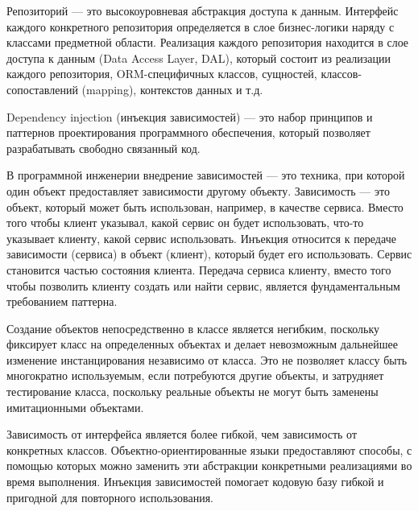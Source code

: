 Репозиторий --- это высокоуровневая абстракция доступа к данным. Интерфейс каждого конкретного репозитория определяется в слое бизнес-логики наряду с классами предметной области. Реализация каждого репозитория находится в слое доступа к данным (Data Access Layer, DAL), который состоит из реализации каждого репозитория, ORM-специфичных классов, сущностей, классов-сопоставлений (mapping), контекстов данных и т.д.



Dependency injection (инъекция зависимостей) \cite{dependency_injection} --- это набор принципов и паттернов проектирования программного обеспечения, который позволяет разрабатывать свободно связанный код.

В программной инженерии внедрение зависимостей --- это техника, при которой один объект предоставляет зависимости другому объекту. Зависимость --- это объект, который может быть использован, например, в качестве сервиса. Вместо того чтобы клиент указывал, какой сервис он будет использовать, что-то указывает клиенту, какой сервис использовать. Инъекция относится к передаче зависимости (сервиса) в объект (клиент), который будет его использовать. Сервис становится частью состояния клиента. Передача сервиса клиенту, вместо того чтобы позволить клиенту создать или найти сервис, является фундаментальным требованием паттерна.

Создание объектов непосредственно в классе является негибким, поскольку фиксирует класс на определенных объектах и делает невозможным дальнейшее изменение инстанцирования независимо от класса. Это не позволяет классу быть многократно используемым, если потребуются другие объекты, и затрудняет тестирование класса, поскольку реальные объекты не могут быть заменены имитационными объектами.

Зависимость от интерфейса является более гибкой, чем зависимость от конкретных классов. Объектно-ориентированные языки предоставляют способы, с помощью которых можно заменить эти абстракции конкретными реализациями во время выполнения. Инъекция зависимостей помогает кодовую базу гибкой и пригодной для повторного использования.




